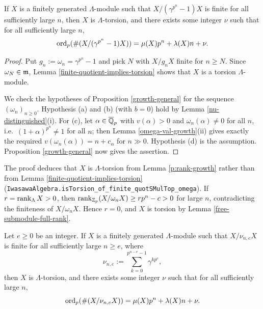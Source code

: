 \begin{prop}
\label{coinvariant-growth}
\leanok
If $X$ is a finitely generated
$\Lambda$-module such that $X/(\gamma^{p^n}-1)X$ is finite
for all sufficiently large $n$,
then $X$ is $\Lambda$-torsion, and
there exists some integer $\nu$
such that for all sufficiently large $n$,
$$
\operatorname{ord}_p(\#(X/(\gamma^{p^n}-1)X))=\mu(X)p^n
+\lambda(X)n+\nu.
$$
\end{prop}

\begin{proof}
\leanok
Put $g_n:=\omega_n=\gamma^{p^n}-1$ and pick $N$ with $X/g_nX$ finite for $n\geq N$.
Since $\omega_N\in{\mathfrak{m}}$, Lemma \ref{finite-quotient-implies-torsion} shows that $X$
is a torsion $\Lambda$-module.

We check the hypotheses of Proposition \ref{growth-general} for the sequence
$(\omega_n)_{n\geq 0}$.
Hypothesis (a) and (b) (with $b=0$) hold by Lemma \ref{nu-distinguished}(i).
For (c), let $\alpha\in\overline{{\mathbb {Q}}}_p$ with $v(\alpha)>0$ and $\omega_n(\alpha)\neq 0$
for all $n$, i.e.~$(1+\alpha)^{p^n}\neq 1$ for all $n$; then
Lemma \ref{omega-val-growth}(ii) gives exactly the required
$v(\omega_n(\alpha))=n+c_\alpha$ for $n\gg 0$.
Hypothesis (d) is the assumption.
Proposition \ref{growth-general} now gives the assertion.
\end{proof}

\begin{remark}
The {\Lean} proof deduces that $X$ is $\Lambda$-torsion from Lemma
\ref{p:rank-growth} rather than from Lemma \ref{finite-quotient-implies-torsion}
(\texttt{IwasawaAlgebra.isTorsion\_of\_finite\_quotSMulTop\_omega}). If
$r=\operatorname{rank}_\Lambda X>0$, then $\operatorname{rank}_{{\mathbb {Z}}_p}(X/\omega_nX)\geq rp^n-c>0$ for large
$n$, contradicting the finiteness of $X/\omega_nX$. Hence $r=0$, and $X$ is
torsion by Lemma \ref{free-submodule-full-rank}.
\end{remark}

\begin{prop}
\label{coinvariant-growth-2}
\leanok
Let $e\geq 0$ be an integer.
If $X$ is a finitely generated
$\Lambda$-module such that $X/\nu_{n,e}X$ is finite
for all sufficiently large $n\geq e$, where
$$
\nu_{n,e}:=\sum_{k=0}^{p^{n-e}-1}\gamma^{kp^e},
$$
then $X$ is $\Lambda$-torsion, and
there exists some integer $\nu$
such that for all sufficiently large $n$,
$$
\operatorname{ord}_p(\#(X/\nu_{n,e}X))=\mu(X)p^n
+\lambda(X)n+\nu.
$$
\end{prop}

